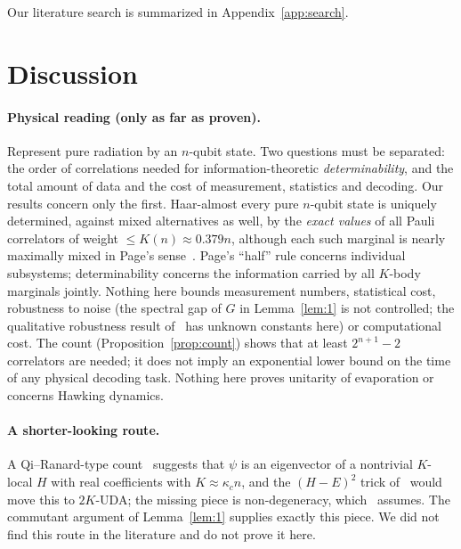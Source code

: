 \documentclass[aps,pra,onecolumn,superscriptaddress,nofootinbib,longbibliography,10pt]{revtex4-2}
\theoremstyle{definition}
\newcommand{\kc}{\kappa_c}
\begin{document}
Our literature search is summarized in Appendix~\ref{app:search}.

\section{Discussion}\label{sec:disc}
\paragraph*{Physical reading (only as far as proven).} Represent pure radiation by an $n$-qubit state. Two questions must be separated: the order of correlations needed for information-theoretic \emph{determinability}, and the total amount of data and the cost of measurement, statistics and decoding. Our results concern only the first. Haar-almost every pure $n$-qubit state is uniquely determined, against mixed alternatives as well, by the \emph{exact values} of all Pauli correlators of weight $\le K(n)\approx0.379n$, although each such marginal is nearly maximally mixed in Page's sense~\cite{Pag93a}. Page's ``half'' rule concerns individual subsystems; determinability concerns the information carried by all $K$-body marginals jointly. Nothing here bounds measurement numbers, statistical cost, robustness to noise (the spectral gap of $G$ in Lemma~\ref{lem:1} is not controlled; the qualitative robustness result of~\cite{YSCZ26} has unknown constants here) or computational cost. The count (Proposition~\ref{prop:count}) shows that at least $2^{n+1}-2$ correlators are needed; it does not imply an exponential lower bound on the time of any physical decoding task. Nothing here proves unitarity of evaporation or concerns Hawking dynamics.

\paragraph*{A shorter-looking route.} A Qi--Ranard-type count~\cite{QR19} suggests that $\psi$ is an eigenvector of a nontrivial $K$-local $H$ with real coefficients with $K\approx\kc n$, and the $(H-E)^2$ trick of~\cite{CJWZ12} would move this to $2K$-UDA; the missing piece is non-degeneracy, which~\cite{CJWZ12} assumes. The commutant argument of Lemma~\ref{lem:1} supplies exactly this piece. We did not find this route in the literature and do not prove it here.
\end{document}
